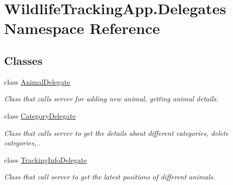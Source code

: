 \hypertarget{namespaceWildlifeTrackingApp_1_1Delegates}{}\section{Wildlife\+Tracking\+App.\+Delegates Namespace Reference}
\label{namespaceWildlifeTrackingApp_1_1Delegates}
\subsection*{Classes}
\begin{DoxyCompactItemize}
\item 
class \hyperlink{classWildlifeTrackingApp_1_1Delegates_1_1AnimalDelegate}{Animal\+Delegate}
\begin{DoxyCompactList}\small\item\em Class that calls server for adding new animal, getting animal details. \end{DoxyCompactList}\item 
class \hyperlink{classWildlifeTrackingApp_1_1Delegates_1_1CategoryDelegate}{Category\+Delegate}
\begin{DoxyCompactList}\small\item\em Class that calls server to get the details about different categories, delete categories,.. \end{DoxyCompactList}\item 
class \hyperlink{classWildlifeTrackingApp_1_1Delegates_1_1TrackingInfoDelegate}{Tracking\+Info\+Delegate}
\begin{DoxyCompactList}\small\item\em Class that call server to get the latest positions of different animals. \end{DoxyCompactList}\end{DoxyCompactItemize}
